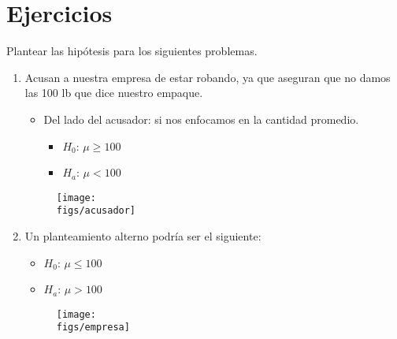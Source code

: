 \section{Ejercicios}
Plantear las hipótesis para los siguientes problemas.
\begin{enumerate}
    \item Acusan a nuestra empresa de estar robando, ya que aseguran que no damos las 100 lb que dice nuestro empaque. 
        \begin{itemize}
            \item Del lado del acusador: si nos enfocamos en la cantidad promedio. 
                \begin{itemize}
                    \item $H_0$: $\mu\geq 100$ 
                    \item $H_a$: $\mu < 100$ 
                \end{itemize}
        \end{itemize}
        \begin{figure}[H]
            \centering
            \texttt{[image: \\figs/acusador]} 
        \end{figure}
    
    \item Un planteamiento alterno podría ser el siguiente:
        \begin{itemize}
            \item $H_0$: $\mu\leq 100$ 
            \item $H_a$: $\mu> 100$ 
        \end{itemize}
        \begin{figure}[H]
            \centering
            \texttt{[image: \\figs/empresa]} 
        \end{figure}
\end{enumerate}
